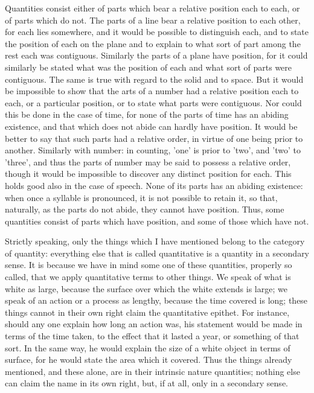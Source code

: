Quantities consist either of parts which bear a relative position each
to each, or of parts which do not. The parts of a line bear a relative
position to each other, for each lies somewhere, and it would be
possible to distinguish each, and to state the position of each on the
plane and to explain to what sort of part among the rest each was
contiguous. Similarly the parts of a plane have position, for it could
similarly be stated what was the position of each and what sort of
parts were contiguous. The same is true with regard to the solid and to
space. But it would be impossible to show that the arts of a number had
a relative position each to each, or a particular position, or to state
what parts were contiguous. Nor could this be done in the case of time,
for none of the parts of time has an abiding existence, and that which
does not abide can hardly have position. It would be better to say that
such parts had a relative order, in virtue of one being prior to
another. Similarly with number: in counting, 'one' is prior to 'two',
and 'two' to 'three', and thus the parts of number may be said to
possess a relative order, though it would be impossible to discover any
distinct position for each. This holds good also in the case of speech.
None of its parts has an abiding existence: when once a syllable is
pronounced, it is not possible to retain it, so that, naturally, as the
parts do not abide, they cannot have position. Thus, some quantities
consist of parts which have position, and some of those which have not.

Strictly speaking, only the things which I have mentioned belong to the
category of quantity: everything else that is called quantitative is a
quantity in a secondary sense. It is because we have in mind some one
of these quantities, properly so called, that we apply quantitative
terms to other things. We speak of what is white as large, because the
surface over which the white extends is large; we speak of an action or
a process as lengthy, because the time covered is long; these things
cannot in their own right claim the quantitative epithet. For instance,
should any one explain how long an action was, his statement would be
made in terms of the time taken, to the effect that it lasted a year,
or something of that sort. In the same way, he would explain the size
of a white object in terms of surface, for he would state the area
which it covered. Thus the things already mentioned, and these alone,
are in their intrinsic nature quantities; nothing else can claim the
name in its own right, but, if at all, only in a secondary sense.

